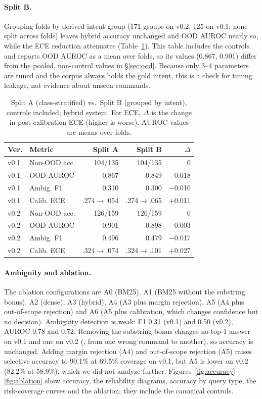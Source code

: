 \paragraph{Split B.} Grouping folds by derived intent group (171 groups on v0.2, 125 on v0.1; none split across folds)
leaves hybrid accuracy unchanged and OOD AUROC nearly so, while the ECE reduction attenuates (Table~\ref{tab:splitb}).
This table includes the controls and reports OOD AUROC as a mean over folds, so its values (0.867, 0.901) differ
from the pooled, non-control values in \S\ref{sec:ood}.
Because only 3--4 parameters are tuned and the corpus always holds the gold intent, this is a check for tuning leakage,
not evidence about unseen commands.

\begin{table}[t]
  \centering
  \small
  \setlength{\tabcolsep}{3pt}
  \begin{tabular}{@{}llrrr@{}}
    \toprule
    \textbf{Ver.} & \textbf{Metric} & \textbf{Split A} & \textbf{Split B} & \textbf{$\Delta$} \\
    \midrule
    v0.1 & Non-OOD acc. & 104/135 & 104/135 & 0 \\
    v0.1 & OOD AUROC & 0.867 & 0.849 & $-$0.018 \\
    v0.1 & Ambig. F1 & 0.310 & 0.300 & $-$0.010 \\
    v0.1 & Calib. ECE & .274$\to$.054 & .274$\to$.065 & $+$0.011 \\
    v0.2 & Non-OOD acc. & 126/159 & 126/159 & 0 \\
    v0.2 & OOD AUROC & 0.901 & 0.898 & $-$0.003 \\
    v0.2 & Ambig. F1 & 0.496 & 0.479 & $-$0.017 \\
    v0.2 & Calib. ECE & .324$\to$.074 & .324$\to$.101 & $+$0.027 \\
    \bottomrule
  \end{tabular}
  \caption{Split A (class-stratified) vs.\ Split B (grouped by intent), controls included; hybrid system. For ECE,
  $\Delta$ is the change in post-calibration ECE (higher is worse). AUROC values are means over folds.}
  \label{tab:splitb}
\end{table}

\paragraph{Ambiguity and ablation.} The ablation configurations are A0 (BM25), A1 (BM25 without the substring bonus),
A2 (dense), A3 (hybrid), A4 (A3 plus margin rejection), A5 (A4 plus out-of-scope rejection) and A6 (A5 plus
calibration, which changes confidence but no decision). Ambiguity detection is weak: F1 0.31 (v0.1) and 0.50 (v0.2), AUROC 0.78 and 0.72.
Removing the substring bonus changes no top-1 answer on v0.1 and one on v0.2 (, from one wrong command
to another), so accuracy is unchanged. Adding margin rejection (A4) and out-of-scope
rejection (A5) raises selective accuracy to 90.1\% at 69.5\% coverage on v0.1, but A5 is lower on v0.2 (82.2\% at 58.9\%),
which we did not analyze further. Figures~\ref{fig:accuracy}--\ref{fig:ablation} show accuracy, the reliability diagrams,
accuracy by query type, the risk-coverage curves and the ablation; they include the canonical controls.

